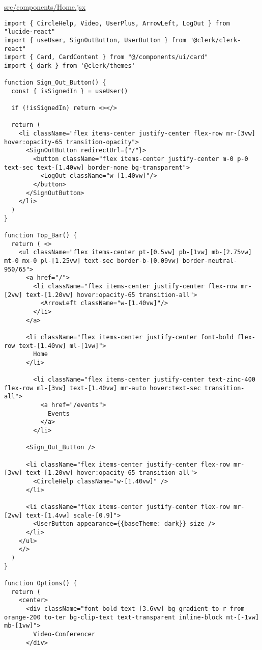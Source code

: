 \underline{src/components/Home.jsx}

\begin{verbatim}
import { CircleHelp, Video, UserPlus, ArrowLeft, LogOut } from "lucide-react"
import { useUser, SignOutButton, UserButton } from "@clerk/clerk-react"
import { Card, CardContent } from "@/components/ui/card"
import { dark } from '@clerk/themes'

function Sign_Out_Button() {
  const { isSignedIn } = useUser()

  if (!isSignedIn) return <></>

  return (
    <li className="flex items-center justify-center flex-row mr-[3vw] hover:opacity-65 transition-opacity">
      <SignOutButton redirectUrl={"/"}>
        <button className="flex items-center justify-center m-0 p-0 text-sec text-[1.40vw] border-none bg-transparent">
          <LogOut className="w-[1.40vw]"/>
        </button>
      </SignOutButton>
    </li>
  )
}

function Top_Bar() {
  return ( <>
    <ul className="flex items-center pt-[0.5vw] pb-[1vw] mb-[2.75vw] mt-0 mx-0 pl-[1.25vw] text-sec border-b-[0.09vw] border-neutral-950/65">
      <a href="/">
        <li className="flex items-center justify-center flex-row mr-[2vw] text-[1.20vw] hover:opacity-65 transition-all">
          <ArrowLeft className="w-[1.40vw]"/>
        </li>
      </a>

      <li className="flex items-center justify-center font-bold flex-row text-[1.40vw] ml-[1vw]">
        Home
      </li>

        <li className="flex items-center justify-center text-zinc-400 flex-row ml-[3vw] text-[1.40vw] mr-auto hover:text-sec transition-all">
          <a href="/events">
            Events
          </a>
        </li>

      <Sign_Out_Button />

      <li className="flex items-center justify-center flex-row mr-[3vw] text-[1.20vw] hover:opacity-65 transition-all">
        <CircleHelp className="w-[1.40vw]" />
      </li>

      <li className="flex items-center justify-center flex-row mr-[2vw] text-[1.4vw] scale-[0.9]">
        <UserButton appearance={{baseTheme: dark}} size />
      </li>
    </ul>
    </>
  )
}

function Options() {
  return (
    <center>
      <div className="font-bold text-[3.6vw] bg-gradient-to-r from-orange-200 to-ter bg-clip-text text-transparent inline-block mt-[-1vw] mb-[1vw]">
        Video-Conferencer
      </div>


\end{verbatim}
